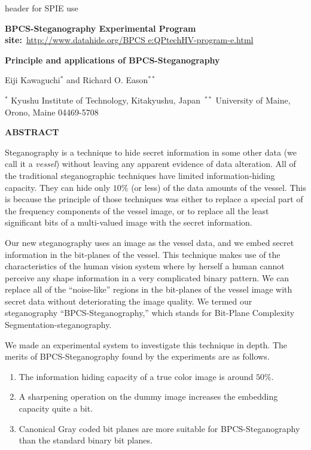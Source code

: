 \documentclass{article}
\begin{document}

header for SPIE use

\begin{center}
\textbf{BPCS-Steganography Experimental Program site:}\
\url{http://www.datahide.org/BPCS e:QPtechHV-program-e.html}

\Large \textbf{Principle and applications of BPCS-Steganography}

\large Eiji Kawaguchi$^*$ and Richard O. Eason$^{**}$

\small $^*$ Kyushu Institute of Technology, Kitakyushu, Japan\
$^{**}$ University of Maine, Orono, Maine 04469-5708
\end{center}

\begin{center}
\textbf{ABSTRACT}
\end{center}

Steganography is a technique to hide secret information in some other data (we call it a \textit{vessel}) without leaving any apparent evidence of data alteration. All of the traditional steganographic techniques have limited information-hiding capacity. They can hide only $10\%$ (or less) of the data amounts of the vessel. This is because the principle of those techniques was either to replace a special part of the frequency components of the vessel image, or to replace all the least significant bits of a multi-valued image with the secret information.

Our new steganography uses an image as the vessel data, and we embed secret information in the bit-planes of the vessel. This technique makes use of the characteristics of the human vision system where by herself a human cannot perceive any shape information in a very complicated binary pattern. We can replace all of the ``noise-like'' regions in the bit-planes of the vessel image with secret data without deteriorating the image quality. We termed our steganography ``BPCS-Steganography,'' which stands for Bit-Plane Complexity Segmentation-steganography.

We made an experimental system to investigate this technique in depth. The merits of BPCS-Steganography found by the experiments are as follows.

\begin{enumerate}
    \item The information hiding capacity of a true color image is around $50\%$.
    \item A sharpening operation on the dummy image increases the embedding capacity quite a bit.
    \item Canonical Gray coded bit planes are more suitable for BPCS-Steganography than the standard binary bit planes.
\end{enumerate}
\end{document}
